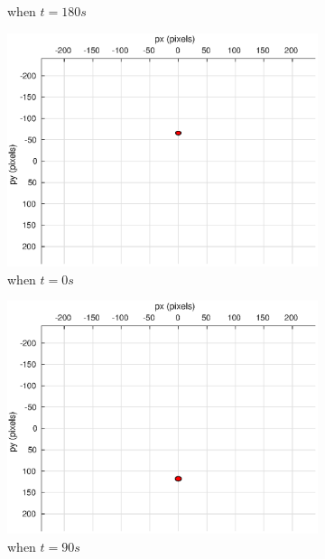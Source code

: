 \begin{figure}[htbp]
\begin{subfigure}[t]{0.32\linewidth}
		\caption{when $t=180s$}
	\end{subfigure}
	\begin{subfigure}[t]{0.32\linewidth}
		\includegraphics[width=\textwidth]{images/chapter4/inertial_camera_-5mps}
		\caption{when $t=0s$}
	\end{subfigure}
	\begin{subfigure}[t]{0.32\linewidth}
		\includegraphics[width=\textwidth]{images/chapter4/inertial_camera_-5mps_90s}
		\caption{when $t=90s$}
	\end{subfigure}
	\begin{subfigure}[t]{0.32\linewidth}

\end{subfigure}
\end{figure}
